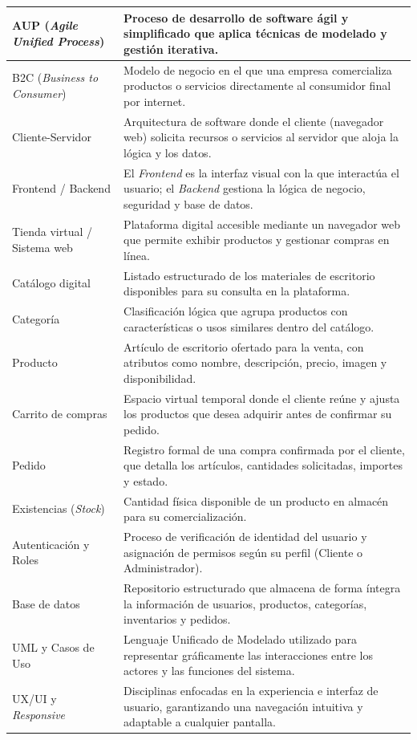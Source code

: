{\begin{xltabular}{\textwidth}{|>{\raggedright\arraybackslash}p{4.2cm}|X|}
    AUP (\textit{Agile Unified Process}) & Proceso de desarrollo de software ágil y simplificado que aplica técnicas de modelado y gestión iterativa. \\
    \hline
    B2C (\textit{Business to Consumer}) & Modelo de negocio en el que una empresa comercializa productos o servicios directamente al consumidor final por internet. \\
    \hline
    Cliente-Servidor & Arquitectura de software donde el cliente (navegador web) solicita recursos o servicios al servidor que aloja la lógica y los datos. \\
    \hline
    Frontend / Backend & El \textit{Frontend} es la interfaz visual con la que interactúa el usuario; el \textit{Backend} gestiona la lógica de negocio, seguridad y base de datos. \\
    \hline
    Tienda virtual / Sistema web & Plataforma digital accesible mediante un navegador web que permite exhibir productos y gestionar compras en línea. \\
    \hline
    Catálogo digital & Listado estructurado de los materiales de escritorio disponibles para su consulta en la plataforma. \\
    \hline
    Categoría & Clasificación lógica que agrupa productos con características o usos similares dentro del catálogo. \\
    \hline
    Producto & Artículo de escritorio ofertado para la venta, con atributos como nombre, descripción, precio, imagen y disponibilidad. \\
    \hline
    Carrito de compras & Espacio virtual temporal donde el cliente reúne y ajusta los productos que desea adquirir antes de confirmar su pedido. \\
    \hline
    Pedido & Registro formal de una compra confirmada por el cliente, que detalla los artículos, cantidades solicitadas, importes y estado. \\
    \hline
    Existencias (\textit{Stock}) & Cantidad física disponible de un producto en almacén para su comercialización. \\
    \hline
    Autenticación y Roles & Proceso de verificación de identidad del usuario y asignación de permisos según su perfil (Cliente o Administrador). \\
    \hline
    Base de datos & Repositorio estructurado que almacena de forma íntegra la información de usuarios, productos, categorías, inventarios y pedidos. \\
    \hline
    UML y Casos de Uso & Lenguaje Unificado de Modelado utilizado para representar gráficamente las interacciones entre los actores y las funciones del sistema. \\
    \hline
    UX/UI y \textit{Responsive} & Disciplinas enfocadas en la experiencia e interfaz de usuario, garantizando una navegación intuitiva y adaptable a cualquier pantalla. \\
    \hline
\end{xltabular}
}

